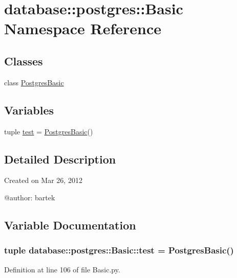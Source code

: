 \hypertarget{namespacedatabase_1_1postgres_1_1Basic}{
\section{database::postgres::Basic Namespace Reference}
\label{namespacedatabase_1_1postgres_1_1Basic}
}
\subsection*{Classes}
\begin{DoxyCompactItemize}
\item 
class \hyperlink{classdatabase_1_1postgres_1_1Basic_1_1PostgresBasic}{PostgresBasic}
\end{DoxyCompactItemize}
\subsection*{Variables}
\begin{DoxyCompactItemize}
\item 
tuple \hyperlink{namespacedatabase_1_1postgres_1_1Basic_a0c4f0abcd044f1e9196d18f6e2e46055}{test} = \hyperlink{classdatabase_1_1postgres_1_1Basic_1_1PostgresBasic}{PostgresBasic}()
\end{DoxyCompactItemize}


\subsection{Detailed Description}
\begin{DoxyVerb}
Created on Mar 26, 2012

@author: bartek
\end{DoxyVerb}
 

\subsection{Variable Documentation}
\hypertarget{namespacedatabase_1_1postgres_1_1Basic_a0c4f0abcd044f1e9196d18f6e2e46055}{
\subsubsection[{test}]{\setlength{\rightskip}{0pt plus 5cm}tuple {\bf database::postgres::Basic::test} = {\bf PostgresBasic}()}}
\label{namespacedatabase_1_1postgres_1_1Basic_a0c4f0abcd044f1e9196d18f6e2e46055}


Definition at line 106 of file Basic.py.

